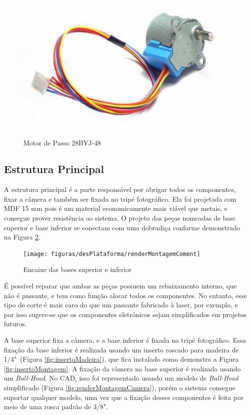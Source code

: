 \begin{figure}[!htb]
	\centering
	\caption{Motor de Passo 28BYJ-48}
	\includegraphics[width=0.4\linewidth]{figuras/desPlataforma/motordepasso}
	\label{fig:28byj}
\end{figure}


\subsection{Estrutura Principal}

A estrutura principal é a parte responsável por abrigar todos os componentes, fixar a câmera e também ser fixada no tripé fotográfico. Ela foi projetada com MDF 15 mm pois é um material economicamente mais viável que metais, e consegue prover resistência ao sistema. O projeto das peças nomeadas de base superior e base inferior se conectam com uma dobradiça conforme demonstrado na Figura \ref{fig:renderMontagem}.

\begin{figure}[!htb]
	\centering
	\caption{Encaixe das bases superior e inferior}
	\texttt{[image: figuras/desPlataforma/renderMontagemComent]}
	\label{fig:renderMontagem}
\end{figure}

É possível reparar que ambas as peças possuem um rebaixamento interno, que não é passante, e tem como função alocar todos os componentes. No entanto, esse tipo de corte é mais caro do que um passante fabricado à laser, por exemplo, e por isso sugere-se que os componentes eletrônicos sejam simplificados em projetos futuros.

A base superior fixa a câmera, e a base inferior é fixada no tripé fotográfico. Essa fixação da base inferior é realizada usando um inserto roscado para madeira de 1/4"~(Figura \ref{fig:insertoMadeira}), que fica instalado como demonstra a Figura \ref{fig:insertoMontagem}. A fixação da câmera na base superior é realizada usando um \textit{Ball-Head}. No CAD, isso foi representado usando um modelo de \textit{Ball-Head} simplificado (Figura \ref{fig:renderMontagemCamera}), porém o sistema consegue suportar qualquer modelo, uma vez que a fixação desses componentes é feita por meio de uma rosca padrão de 3/8".

